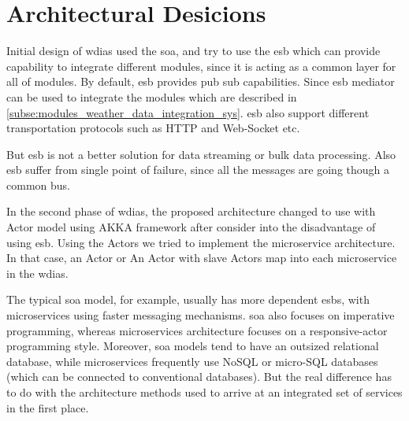 \section{Architectural Desicions}
\label{se:architectural_decisions}

Initial design of \acrshort{wdias} used the \acrfull{soa}, and try to use the \acrfull{esb} which can provide capability to integrate different modules, since it is acting as a common layer for all of modules. By default, \acrshort{esb} provides pub sub capabilities.
Since \acrshort{esb} mediator can be used to integrate the modules which are described in \ref{subse:modules_weather_data_integration_sys}. \acrshort{esb} also support different transportation protocols such as HTTP and Web-Socket etc.

But \acrshort{esb} is not a better solution for data streaming or bulk data processing. Also \acrshort{esb} suffer from single point of failure, since all the messages are going though a common bus.

In the second phase of \acrshort{wdias}, the proposed architecture changed to use with Actor model using AKKA framework \cite{HewittWhyDocumentation} after consider into the disadvantage of using \acrshort{esb}. Using the Actors we tried to implement the microservice architecture. In that case, an Actor or An Actor with slave Actors map into each microservice in the \acrshort{wdias}.

The typical \acrshort{soa} model, for example, usually has more dependent \acrshort{esb}s, with microservices using faster messaging mechanisms. \acrshort{soa} also focuses on imperative programming, whereas microservices architecture focuses on a responsive-actor programming style. Moreover, \acrshort{soa} models tend to have an outsized relational database, while microservices frequently use NoSQL or micro-SQL databases (which can be connected to conventional databases). But the real difference has to do with the architecture methods used to arrive at an integrated set of services in the first place.

